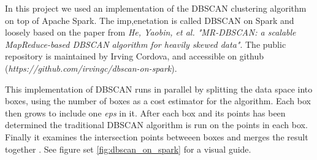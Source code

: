  In this project we used an implementation of the DBSCAN clustering algorithm on top of Apache Spark. The imp,enetation is called DBSCAN on Spark \cite{dbscan_on_spark} and loosely based on the paper from \textit{He, Yaobin, et al. "MR-DBSCAN: a scalable MapReduce-based DBSCAN algorithm for heavily skewed data"}. The public repository is maintained by Irving Cordova, and accessible on github (\textit{https://github.com/irvingc/dbscan-on-spark}).
 
  This implementation of DBSCAN runs in parallel by splitting the data space into boxes, using the number of boxes as a cost estimator for the algorithm. Each box then grows to include one \textit{eps} in it. After each box and its points has been determined the traditional DBSCAN algorithm is run on the points in each box. Finally it examines the intersection points betweeen boxes and merges the result together \cite{vis_dbscan_on_spark}. See figure set \ref{fig:dbscan_on_spark} for a visual guide. 
 
